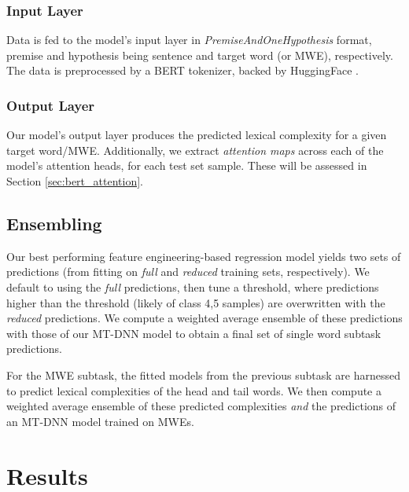 \documentclass[11pt,a4paper]{article}
\begin{document}
\subsubsection{Input Layer}

Data is fed to the model's input layer in \textit{PremiseAndOneHypothesis} format, premise and hypothesis being sentence and target word (or MWE), respectively. The data is preprocessed by a BERT tokenizer, backed by HuggingFace \citep{wolf2020transformers}.

\subsubsection{Output Layer}

Our model's output layer produces the predicted lexical complexity for a given target word/MWE. Additionally, we extract \textit{attention maps} across each of the model's attention heads, for each test set sample. These will be assessed in Section \ref{sec:bert_attention}.

\subsection{Ensembling}

\label{sec:ensembling}

Our best performing feature engineering-based regression model yields two sets of predictions (from fitting on \textit{full} and \textit{reduced} training sets, respectively). We default to using the \textit{full} predictions, then tune a threshold, where predictions higher than the threshold (likely of class 4,5 samples) are overwritten with the \textit{reduced} predictions. We compute a weighted average ensemble of these predictions with those of our MT-DNN model to obtain a final set of single word subtask predictions. 

For the MWE subtask, the fitted models from the previous subtask are harnessed to predict lexical complexities of the head and tail words. We then compute a weighted average ensemble of these predicted complexities \textit{and} the predictions of an MT-DNN model trained on MWEs.

\section{Results}
\end{document}
